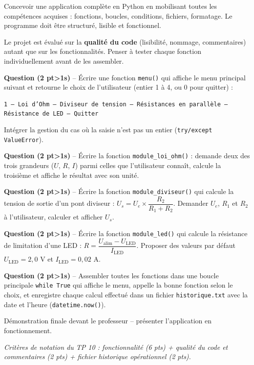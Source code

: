 \documentclass[11pt,a4paper]{article}
\newcommand{\cadreblanc}[1]{%
  \medskip\framebox[\linewidth][c]{\rule{0mm}{#1mm}}\par\medskip}
\newcounter{qnum}
\newcommand{\q}[2]{%
  \stepcounter{qnum}%
  \noindent\textbf{Question \theqnum{} \normalfont(#2 pt\ifnum#2>1s\fi)} -- #1\par\smallskip}
\begin{document}
\begin{objectifbox}{}
  Concevoir une application complète en Python en mobilisant toutes les compétences acquises : fonctions, boucles, conditions, fichiers, formatage. Le programme doit être structuré, lisible et fonctionnel.
\end{objectifbox}

\begin{astucebox}
Le projet est évalué sur la \textbf{qualité du code} (lisibilité, nommage, commentaires) autant que sur les fonctionnalités. Penser à tester chaque fonction individuellement avant de les assembler.
\end{astucebox}

\q{Écrire une fonction \texttt{menu()} qui affiche le menu principal suivant et retourne le choix de l'utilisateur (entier 1 à 4, ou 0 pour quitter) :
\begin{center}
\texttt{1 -- Loi d'Ohm \quad 2 -- Diviseur de tension \quad 3 -- Résistances en parallèle \quad 4 -- Résistance de LED \quad 0 -- Quitter}
\end{center}
Intégrer la gestion du cas où la saisie n'est pas un entier (\texttt{try/except ValueError}).}{2}
\cadreblanc{28}

\q{Écrire la fonction \texttt{module\_loi\_ohm()} : demande deux des trois grandeurs ($U$, $R$, $I$) parmi celles que l'utilisateur connaît, calcule la troisième et affiche le résultat avec son unité.}{2}
\cadreblanc{28}

\q{Écrire la fonction \texttt{module\_diviseur()} qui calcule la tension de sortie d'un pont diviseur :
$U_s = U_e \times \dfrac{R_2}{R_1 + R_2}$.
Demander $U_e$, $R_1$ et $R_2$ à l'utilisateur, calculer et afficher $U_s$.}{2}
\cadreblanc{24}

\q{Écrire la fonction \texttt{module\_led()} qui calcule la résistance de limitation d'une LED :
$R = \dfrac{U_{\text{alim}} - U_{\text{LED}}}{I_{\text{LED}}}$.
Proposer des valeurs par défaut $U_{\text{LED}} = 2{,}0$ V et $I_{\text{LED}} = 0{,}02$ A.}{2}
\cadreblanc{24}

\q{Assembler toutes les fonctions dans une boucle principale \texttt{while True} qui affiche le menu, appelle la bonne fonction selon le choix, et enregistre chaque calcul effectué dans un fichier \texttt{historique.txt} avec la date et l'heure (\texttt{datetime.now()}).}{2}
\cadreblanc{30}

\begin{appelbox}
  \centering Démonstration finale devant le professeur -- présenter l'application en fonctionnement.
\end{appelbox}

\vfill
{\small\textit{Critères de notation du TP 10 : fonctionnalité (6 pts) + qualité du code et commentaires (2 pts) + fichier historique opérationnel (2 pts).}}

\end{document}
